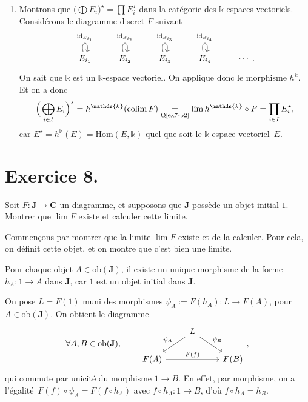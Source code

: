 \documentclass{../../td}
\let\bm\boldsymbol
\begin{document}
\begin{enumerate}
    \item Montrons que $\big(\!\bigoplus E_i\big)^\star = \prod E_i^\star$ dans la catégorie des  $\mathds{k}$-espaces vectoriels.
      Considérons le diagramme discret $F$ suivant \[
        \begin{tikzcd}
          E_{i_1} \arrow[loop above]{}{\mathrm{id}_{E_{i_1}}} &
          E_{i_2} \arrow[loop above]{}{\mathrm{id}_{E_{i_2}}} &
          E_{i_3} \arrow[loop above]{}{\mathrm{id}_{E_{i_3}}} &
          E_{i_4} \arrow[loop above]{}{\mathrm{id}_{E_{i_4}}} & \cdots 
        \end{tikzcd}
      .\]
      On sait que $\mathds{k}$ est un $\mathds{k}$-espace vectoriel. On applique donc le morphisme $h^\mathds{k}$.
      Et on a donc \[
        \Big(\bigoplus_{i \in I} E_i\Big)^\star = h^\mathds{k}(\operatorname{colim} F) \underset {\text{Q\ref{ex7-p2}}} = \lim h^\mathds{k} \circ F = \prod_{i \in I} E_i^\star
      ,\] car $E^\star = h^\mathds{k}(E) = \mathrm{Hom}(E, \mathds{k})$ quel que soit le $\mathds{k}$-espace vectoriel~$E$.
  \end{enumerate}


  \chapter{Exercice 8.}

  \begin{slshape}
    \color{deepblue}
    Soit $F : \mathbf{J} \to \mathbf{C}$ un diagramme, et supposons que $\mathbf{J}$ possède un objet initial $\bm{\mathit{1}}$. Montrer que $\lim F$ existe et calculer cette limite.
  \end{slshape}

  Commençons par montrer que la limite $\lim F$ existe et de la calculer.
  Pour cela, on définit cette objet, et on montre que c'est bien une limite.

  Pour chaque objet $A \in \mathrm{ob}(\mathbf{J})$, il existe un unique morphisme de la forme $h_A : \bm{\mathit{1}} \to A$ dans $\mathbf{J}$, car $\bm{\mathit{1}}$ est un objet initial dans $\mathbf{J}$.

  On pose $L = F(\bm{\mathit{1}})$ muni des morphismes $\psi_A := F(h_A) : L \to F(A)$, pour $A \in \mathrm{ob}(\mathbf{J})$. On obtient le diagramme
  \[
    \forall A,B \in \mathrm{ob}(\mathbf{J}), \quad\quad
  \begin{tikzcd}
    & L \arrow[swap]{dl}{\psi_A} \arrow{dr}{\psi_B}\\
    F(A) \arrow{rr}{F(f)} && F(B)
  \end{tikzcd},
  \]
  qui commute par unicité du morphisme $\bm{\mathit{1}} \to B$. En effet, par morphisme, on a l'égalité~$F(f) \circ \psi_A = F(f \circ h_A)$ avec $f\circ h_A : \bm{\mathit{1}} \to B$, d'où $f\circ h_A = h_B$.
\end{document}

